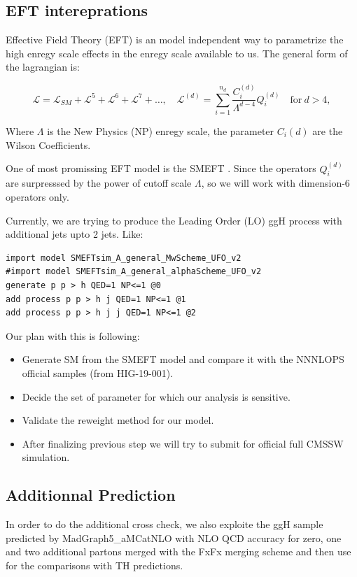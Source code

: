 \subsection{EFT intereprations}

Effective Field Theory (EFT) is an model independent way to parametrize the high enregy scale effects in the enregy scale available to us. The general form of the lagrangian is:

\begin{equation}
    \mathcal{L} = \mathcal{L}_{SM} + \mathcal{L}^{5} + \mathcal{L}^{6} + \mathcal{L}^{7} + \ldots,\quad \mathcal{L}^{(d)} = \sum_{i=1}^{n_d} \frac{C_i^{(d)}}{\Lambda^{d-4}}Q_i^{(d)} \quad \textrm{for}~ d>4,
\end{equation}

Where $\Lambda$ is the New Physics (NP) enregy scale, the parameter $C_{i}{(d)}$ are the Wilson Coefficients.

One of most promissing EFT model is the SMEFT \cite{Brivio:2017btx,Aebischer:2017ugx}. Since the operators $Q_{i}^{(d)}$ are surpresssed by the power of cutoff scale $\Lambda$, so we will work with dimension-6 operators only.

Currently, we are trying to produce the Leading Order (LO) ggH process with additional jets upto 2 jets. Like:

\begin{verbatim}
import model SMEFTsim_A_general_MwScheme_UFO_v2
#import model SMEFTsim_A_general_alphaScheme_UFO_v2
generate p p > h QED=1 NP<=1 @0
add process p p > h j QED=1 NP<=1 @1
add process p p > h j j QED=1 NP<=1 @2
\end{verbatim}

Our plan with this is following:

\begin{itemize}
    \item Generate SM from the SMEFT model and compare it with the NNNLOPS official samples (from HIG-19-001).
    \item Decide the set of parameter for which our analysis is sensitive.
    \item Validate the reweight method for our model.
    \item After finalizing previous step we will try to submit for official full CMSSW simulation.
\end{itemize}

\subsection{Additionnal Prediction}
In order to do the additional cross check, we also exploite the ggH sample predicted by MadGraph5_aMCatNLO with NLO QCD accuracy for zero, one and two additional partons merged with the FxFx merging scheme and then use for the comparisons with TH predictions.

